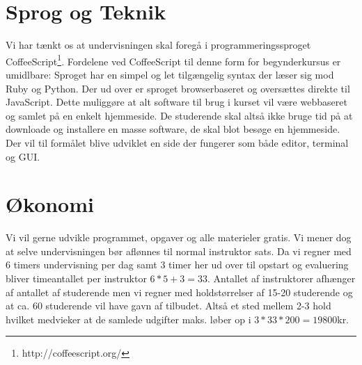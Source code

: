 \documentclass[11pt,a4paper]{article}
\begin{document}
\section{Sprog og Teknik}
Vi har tænkt os at undervisningen skal foregå i programmeringssproget 
CoffeeScript\footnote{http://coffeescript.org/}. Fordelene ved CoffeeScript
til denne form for begynderkursus er umidlbare: Sproget har en simpel og let 
tilgængelig syntax der læser sig mod Ruby og Python. Der ud over er sproget
browserbaseret og oversættes direkte til JavaScript. Dette muliggøre at alt 
software til brug i kurset vil være webbaseret og samlet på en enkelt hjemmeside.
De studerende skal altså ikke bruge tid på at downloade og installere en masse
software, de skal blot besøge en hjemmeside. Der vil til formålet blive udviklet
en side der fungerer som både editor, terminal og GUI.

\section{Økonomi}
Vi vil gerne udvikle programmet, opgaver og alle materieler gratis. Vi mener dog 
at selve undervisningen bør aflønnes til normal instruktor sats. Da vi regner 
med 6 timers undervisning per dag samt 3 timer her ud over til opstart og 
evaluering bliver timeantallet per instruktor $6*5 + 3 = 33$. Antallet af 
instruktorer afhænger af antallet af studerende men vi regner med holdstørrelser
af 15-20 studerende og at ca. 60 studerende vil have gavn af tilbudet. Altså et 
sted mellem 2-3 hold hvilket medvieker at de samlede udgifter maks. løber op i 
$3 * 33 * 200 = 19800$kr.
\end{document}
